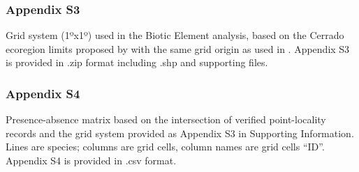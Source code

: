 \documentclass[12pt,openright,oneside,a4paper,english]{abntex2}
\begin{document}
\subsection*{Appendix S3}\label{sup:2-s3}

Grid system (1ºx1º) used in the Biotic Element analysis, based on the Cerrado ecoregion limits proposed by \citet{Dinerstein2017} with the same grid origin as used in \citet{Azevedo2016}. Appendix S3 is provided in .zip format including .shp and supporting files.

\subsection*{Appendix S4}\label{sup:2-s4}

Presence-absence matrix based on the intersection of verified point-locality records and the grid system provided as Appendix S3 in Supporting Information. Lines are species; columns are grid cells, column names are grid cells “ID”. Appendix S4 is provided in .csv format.


\chapter[Priority Areas of Cerrado hotspot]{}\label{chap3}
\end{document}
